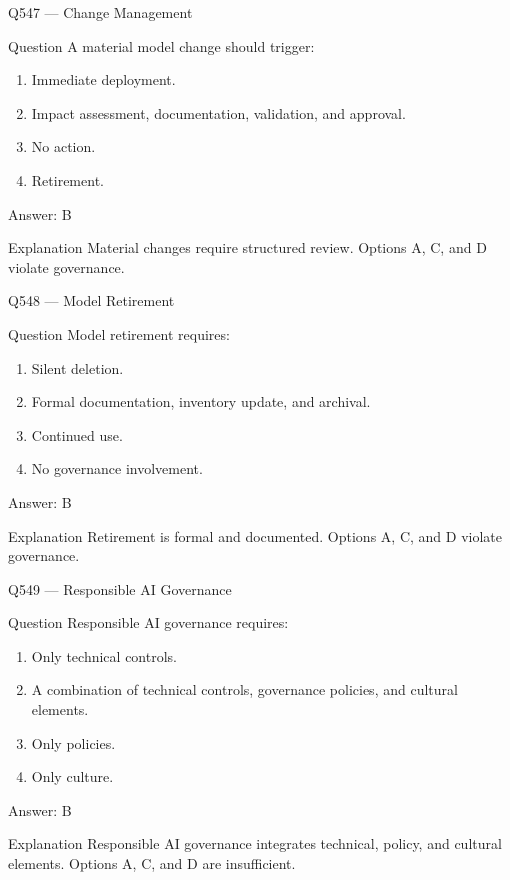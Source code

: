 \documentclass[aspectratio=169,8pt]{beamer}
\begin{document}
	\begin{frame}{Q547 --- Change Management}
		\begin{block}{Question}
			A material model change should trigger:
			\begin{enumerate}
				\item Immediate deployment.
				\item Impact assessment, documentation, validation, and approval.
				\item No action.
				\item Retirement.
			\end{enumerate}
		\end{block}
		\begin{exampleblock}{Answer: B}\end{exampleblock}
		\begin{block}{Explanation}
			Material changes require structured review. Options A, C, and D violate governance.
		\end{block}
	\end{frame}
	
	\begin{frame}{Q548 --- Model Retirement}
		\begin{block}{Question}
			Model retirement requires:
			\begin{enumerate}
				\item Silent deletion.
				\item Formal documentation, inventory update, and archival.
				\item Continued use.
				\item No governance involvement.
			\end{enumerate}
		\end{block}
		\begin{exampleblock}{Answer: B}\end{exampleblock}
		\begin{block}{Explanation}
			Retirement is formal and documented. Options A, C, and D violate governance.
		\end{block}
	\end{frame}
	
	\begin{frame}{Q549 --- Responsible AI Governance}
		\begin{block}{Question}
			Responsible AI governance requires:
			\begin{enumerate}
				\item Only technical controls.
				\item A combination of technical controls, governance policies, and cultural elements.
				\item Only policies.
				\item Only culture.
			\end{enumerate}
		\end{block}
		\begin{exampleblock}{Answer: B}\end{exampleblock}
		\begin{block}{Explanation}
			Responsible AI governance integrates technical, policy, and cultural elements. Options A, C, and D are insufficient.
		\end{block}
	\end{frame}
	
\end{document}
